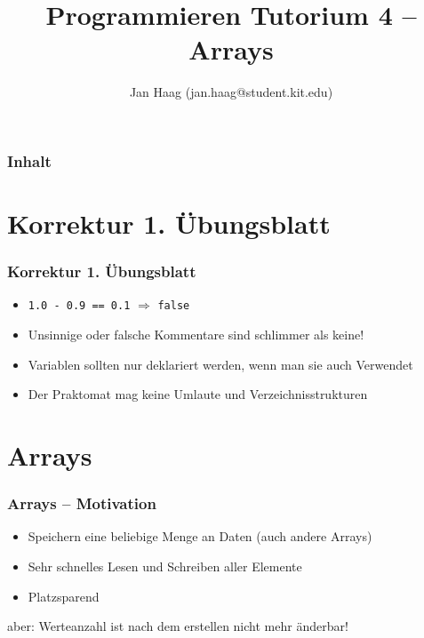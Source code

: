 \documentclass{beamer}
\author{Jan Haag (jan.haag@student.kit.edu)}
\title{Programmieren Tutorium 4 -- Arrays}
\institute{Institut f\"ur Theoretische Informatik}
\begin{document}
\begin{frame}
\maketitle
\end{frame}

\begin{frame}
\frametitle{Inhalt}
\tableofcontents
\end{frame}


\section{Korrektur 1. \"Ubungsblatt}
\begin{frame}[fragile]
    \frametitle{Korrektur 1. \"Ubungsblatt}
    \begin{itemize}
        \item \verb|1.0 - 0.9 == 0.1| $\Rightarrow$ \verb|false|
        \item Unsinnige oder falsche Kommentare sind schlimmer als keine!
        \item Variablen sollten nur deklariert werden, wenn man sie
            auch Verwendet
        \item Der Praktomat mag keine Umlaute und Verzeichnisstrukturen
    \end{itemize}
\end{frame}

\section{Arrays}
\begin{frame}
\frametitle{Arrays -- Motivation}
\begin{itemize}
\item Speichern eine beliebige Menge an Daten (auch andere Arrays)
\item Sehr schnelles Lesen und Schreiben aller Elemente
\item Platzsparend
\end{itemize}
\pause
aber: Werteanzahl ist nach dem erstellen nicht mehr \"{a}nderbar!
\end{frame}
\end{document}
